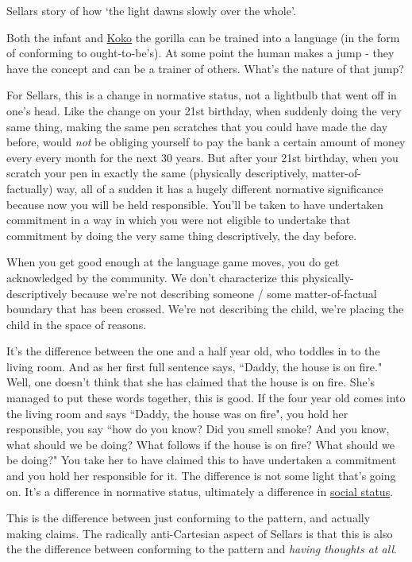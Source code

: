 Sellars story of how `the light dawns slowly over the whole'.

Both the infant and \href{https://en.wikipedia.org/wiki/Koko_(gorilla)}{Koko} the gorilla can be trained into a language (in the form of conforming to ought-to-be's). At some point the human makes a jump - they have the concept and can be a trainer of others. What's the nature of that jump?

For Sellars, this is a change in normative status, not a lightbulb that went off in one's head. Like the change on your 21st birthday, when suddenly doing the very same thing, making the same pen scratches that you could have made the day before, would \emph{not} be obliging yourself to pay the bank a certain amount of money every every month for the next 30 years. But after your 21st birthday, when you scratch your pen in exactly the same (physically descriptively, matter-of-factually) way, all of a sudden it has a hugely different normative significance because now you will be held responsible. You'll be taken to have undertaken commitment in a way in which you were not eligible to undertake that commitment by doing the very same thing descriptively, the day before.

When you get good enough at the language game moves, you do get acknowledged by the community. We don't characterize this physically-descriptively because we're not describing someone / some matter-of-factual boundary that has been crossed. We're not describing the child, we're placing the child in the space of reasons.

It's the difference between the one and a half year old, who toddles in to the living room. And as her first full sentence says, ``Daddy, the house is on fire." Well, one doesn't think that she has claimed that the house is on fire. She's managed to put these words together, this is good. If the four year old comes into the living room and says ``Daddy, the house was on fire", you hold her responsible, you say ``how do you know? Did you smell smoke? And you know, what should we be doing? What follows if the house is on fire? What should we be doing?" You take her to have claimed this to have undertaken a commitment and you hold her responsible for it. The difference is not some light that's going on. It's a difference in normative status, ultimately a difference in \href{doc/phil/People/Brandom/Slogans/Sapience}{social status}.

This is the difference between just conforming to the pattern, and actually making claims. The radically anti-Cartesian aspect of Sellars is that this is also the the difference between conforming to the pattern and \emph{having thoughts at all}.


